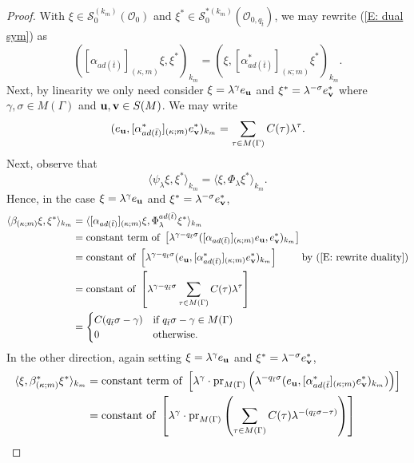 \documentclass{article}
\theoremstyle{remark}
\def\c #1{ {\mathcal #1} }
\def\b #1{ {\bf #1} }
\begin{document}
\begin{proof}
With $\xi \in \c S_0^{(k_m)}(\c O_0)$ and $\xi^* \in \c S_0^{*(k_m)}(\c O_{0, q_{\bar t}})$, we may rewrite (\ref{E: dual sym}) as
\begin{equation}\label{E: rewrite duality}
( [ \alpha_{a d(\bar t)}]_{(\kappa, m)} \xi, \xi^*)_{k_m} = (\xi,  [\alpha_{a d(\bar t)}^*]_{(\kappa; m)} \xi^*)_{k_m}.
\end{equation}
Next, by linearity we only need consider $\xi = \lambda^\gamma e_{\b u}$ and $\xi^* = \lambda^{-\sigma} e_{\b v}^*$ where $\gamma, \sigma \in M(\Gamma)$ and $\b u, \b v \in S(M)$. We may write
\[
(e_{\b u}, [\alpha_{a d(\bar t)}^*]_{(\kappa; m)} e_{\b v}^*)_{k_m} = \sum_{\tau \in M(\Gamma)} C(\tau) \lambda^\tau.
\]
Next, observe that
\[
\langle \psi_\lambda \xi, \xi^* \rangle_{k_m} = \langle \xi, \Phi_\lambda \xi^* \rangle_{k_m}.
\]
Hence, in the case $\xi = \lambda^\gamma e_{\b u}$ and $\xi^* = \lambda^{-\sigma} e_{\b v}^*$,
\begin{align*}
\langle \beta_{(\kappa; m)} \xi, \xi^* \rangle_{k_m} &= \langle [\alpha_{a d(\bar t)}]_{(\kappa; m)} \xi, \Phi_\lambda^{a d(\bar t)} \xi^* \rangle_{k_m} \\
&= \text{constant term of } \left[ \lambda^{\gamma - q_{\bar t} \sigma} ([\alpha_{a d(\bar t)}]_{(\kappa; m)} e_{\b u}, e_{\b v}^*)_{k_m} \right] \\
&= \text{constant of } \left[ \lambda^{\gamma - q_{\bar t} \sigma} ( e_{\b u}, [\alpha_{a d(\bar t)}^*]_{(\kappa; m)} e_{\b v}^*)_{k_m} \right] \qquad \text{ by (\ref{E: rewrite duality}}) \\
&= \text{constant of } \left[ \lambda^{\gamma - q_{\bar t} \sigma} \sum_{\tau \in M(\Gamma)} C(\tau) \lambda^{\tau} \right] \\
&=
\begin{cases}
C(q_{\bar t} \sigma - \gamma) & \text{if } q_{\bar t} \sigma - \gamma \in M(\Gamma) \\
0 & \text{otherwise.}
\end{cases}
\end{align*}
In the other direction, again setting $\xi = \lambda^\gamma e_{\b u}$ and $\xi^* = \lambda^{-\sigma} e_{\b v}^*$,
\begin{align*}
\langle \xi, \beta_{(\kappa; m)}^* \xi^* \rangle_{k_m} &= \text{constant term of }  \left[ \lambda^\gamma \cdot \text{pr}_{M(\Gamma)}\left( \lambda^{-q_{\bar t} \sigma} (e_{\b u}, [\alpha_{a d(\bar t}^*]_{(\kappa; m)} e_{\b v}^*)_{k_m} ) \right) \right] \\
&= \text{constant of } \left[ \lambda^\gamma \cdot \text{pr}_{M(\Gamma)}\left( \sum_{\tau \in M(\Gamma)} C(\tau) \lambda^{-(q_{\bar t} \sigma - \tau)} \right) \right] \\

\end{align*}
\end{proof}
\end{document}
